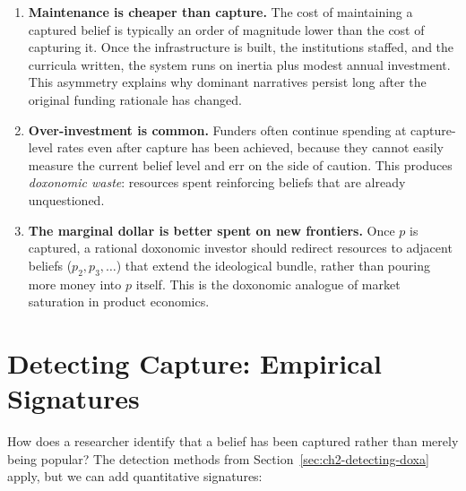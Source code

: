 \begin{enumerate}[nosep]
  \item \textbf{Maintenance is cheaper than capture.}
  The cost of maintaining a captured belief is typically an order of magnitude lower than the cost of capturing it.
  Once the infrastructure is built, the institutions staffed, and the curricula written, the system runs on inertia plus modest annual investment.
  This asymmetry explains why dominant narratives persist long after the original funding rationale has changed.

  \item \textbf{Over-investment is common.}
  Funders often continue spending at capture-level rates even after capture has been achieved, because they cannot easily measure the current belief level and err on the side of caution.
  This produces \emph{doxonomic waste}: resources spent reinforcing beliefs that are already unquestioned.

  \item \textbf{The marginal dollar is better spent on new frontiers.}
  Once $p$ is captured, a rational doxonomic investor should redirect resources to adjacent beliefs ($p_2, p_3, \ldots$) that extend the ideological bundle, rather than pouring more money into $p$ itself.
  This is the doxonomic analogue of market saturation in product economics.
\end{enumerate}


\section{Detecting Capture: Empirical Signatures}
\label{sec:ch8-detection}

How does a researcher identify that a belief has been captured rather than merely being popular?
The detection methods from Section~\ref{sec:ch2-detecting-doxa} apply, but we can add quantitative signatures:


